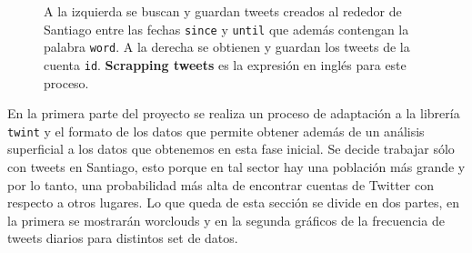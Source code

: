 \documentclass{article}
\begin{document}
\begin{figure}[H]

	\centering
	\caption{A la izquierda se buscan y guardan tweets creados al rededor de Santiago entre las fechas \texttt{since} y \texttt{until} que además contengan la palabra \texttt{word}. A la derecha se obtienen y guardan los tweets de la cuenta \texttt{id}. \textbf{Scrapping tweets} es la expresión en inglés para este proceso.}
\end{figure}

En la primera parte del proyecto se realiza un proceso de adaptación a la librería \texttt{twint} y el formato de los datos que permite obtener además de un análisis superficial a los datos que obtenemos en esta fase inicial. Se decide trabajar sólo con tweets en Santiago, esto porque en tal sector hay una población más grande y por lo tanto, una probabilidad más alta de encontrar cuentas de Twitter con respecto a otros lugares. Lo que queda de esta sección se divide en dos partes, en la primera se mostrarán worclouds y en la segunda gráficos de la frecuencia de tweets diarios para distintos set de datos.
\end{document}
